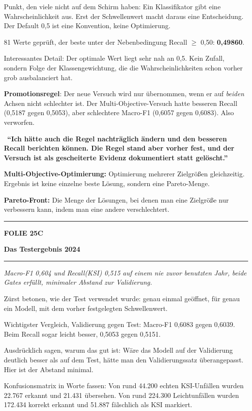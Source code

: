\documentclass[9pt]{extarticle}
\newcommand{\karte}[3]{%
  \clearpage
  {\color{Accent}\rule{\linewidth}{2.4pt}}\par\vspace{2.5pt}
  {\fontsize{8}{9}\selectfont\bfseries\color{Accent}%
   FOLIE #1\hspace{1.2em}\textbar\hspace{1.2em}#2}\par\vspace{1pt}
  {\fontsize{16}{18}\selectfont\bfseries\color{AccentDark}#3}\par\vspace{3pt}
  {\color{Accent!45}\rule{\linewidth}{0.5pt}}\par\vspace{4pt}%
}
\newcommand{\rubrik}[1]{%
  \vspace{3.5pt}{\fontsize{7.5}{8.5}\selectfont\bfseries\color{Grau}%
  \MakeUppercase{#1}}\par\vspace{1.5pt}}
\newcommand{\kernsatz}[1]{%
  \begin{tcolorbox}[enhanced,sharp corners,boxrule=0pt,
    leftrule=2.2pt,colframe=Accent,colback=AccentPale,
    left=5pt,right=5pt,top=3.5pt,bottom=3.5pt,before skip=1pt,after skip=2pt]
    \color{AccentDark}\itshape #1
  \end{tcolorbox}}
\newcommand{\merksatz}[1]{%
  \vspace{2pt}{\color{KSI}$\blacktriangleright$}\ \textbf{\color{KSI}#1}\par}
\newcommand{\bg}[2]{\item \textbf{#1:} #2}
\begin{document}
\rubrik{Sagen}
\begin{sag}
  \item Punkt, den viele nicht auf dem Schirm haben: Ein Klassifikator gibt eine
        Wahrscheinlichkeit aus. Erst der Schwellenwert macht daraus eine Entscheidung.
        Der Default 0,5 ist eine Konvention, keine Optimierung.
  \item 81 Werte geprüft, der beste unter der Nebenbedingung Recall $\geq$ 0,50: \textbf{0,49860}.
  \item Interessantes Detail: Der optimale Wert liegt sehr nah an 0,5. Kein Zufall, sondern Folge
        der Klassengewichtung, die die Wahrscheinlichkeiten schon vorher grob ausbalanciert hat.
  \item \textbf{Promotionsregel}: Der neue Versuch wird nur übernommen, wenn er auf
        \textit{beiden} Achsen nicht schlechter ist. Der Multi-Objective-Versuch hatte besseren
        Recall (0,5187 gegen 0,5053), aber schlechtere Macro-F1 (0,6057 gegen 0,6083).
        Also verworfen.
\end{sag}

\merksatz{\enquote{Ich hätte auch die Regel nachträglich ändern und den besseren Recall
berichten können. Die Regel stand aber vorher fest, und der Versuch ist als gescheiterte Evidenz
dokumentiert statt gelöscht.}}

\rubrik{Begriffe}
\begin{begriff}
  \bg{Multi-Objective-Optimierung}{Optimierung mehrerer Zielgrößen gleichzeitig. Ergebnis ist
      keine einzelne beste Lösung, sondern eine Pareto-Menge.}
  \bg{Pareto-Front}{Die Menge der Lösungen, bei denen man eine Zielgröße nur verbessern kann,
      indem man eine andere verschlechtert.}
\end{begriff}

\karte{25}{C}{Das Testergebnis 2024}

\kernsatz{Macro-F1 0,604 und Recall(KSI) 0,515 auf einem nie zuvor benutzten Jahr, beide Gates
erfüllt, minimaler Abstand zur Validierung.}

\rubrik{Sagen}
\begin{sag}
  \item Zürst betonen, wie der Test verwendet wurde: genau einmal geöffnet, für genau ein
        Modell, mit dem vorher festgelegten Schwellenwert.
  \item Wichtigster Vergleich, Validierung gegen Test: Macro-F1 0,6083 gegen 0,6039. Beim Recall
        sogar leicht besser, 0,5053 gegen 0,5151.
  \item Ausdrücklich sagen, warum das gut ist: Wäre das Modell auf der Validierung deutlich
        besser als auf dem Test, hätte man den Validierungssatz überangepasst. Hier ist der
        Abstand minimal.
  \item Konfusionsmatrix in Worte fassen: Von rund 44.200 echten KSI-Unfällen wurden 22.767
        erkannt und 21.431 übersehen. Von rund 224.300 Leichtunfällen wurden 172.434 korrekt
        erkannt und 51.887 fälschlich als KSI markiert.
\end{sag}
\end{document}
